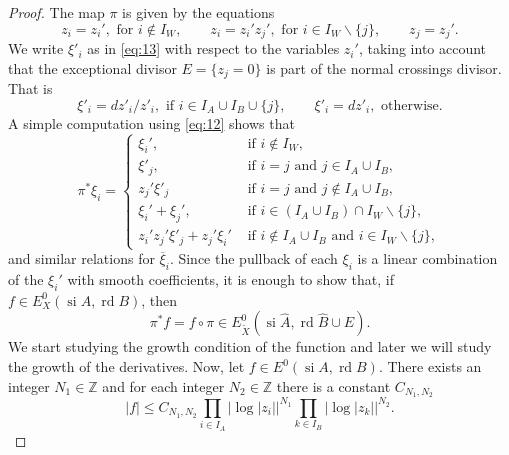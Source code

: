 \documentclass[11pt,a4paper]{amsart}
\newcommand{\Z}{\mathds{Z}}
\DeclareMathOperator{\si}{si}
\DeclareMathOperator{\rd}{rd}
\numberwithin{equation}{section}
\theoremstyle{plain}
\theoremstyle{definition}
\begin{document}
\begin{proof}
  The map $\pi $ is given by the equations
  \begin{equation}\label{eq:12}
    z_{i}=z_{i}', \text{ for }i\not \in I_{W},\qquad 
    z_{i}=z_{i}'z_{j}', \text{ for }i \in I_{W}\smallsetminus \{j\},\qquad
    z_{j}=z_{j}'.
  \end{equation}
  We write $\xi'_{i}$ as in \eqref{eq:13} with respect to the
  variables $z_{i}'$, taking into account that the exceptional divisor
  $E=\{z_{j}=0\}$ is part of the normal crossings divisor.  That is
  \begin{displaymath}
    \xi'_{i}=dz'_{i}/z'_{i},\text{ if }i\in I_{A}\cup
    I_{B}\cup\{j\},\qquad
    \xi'_{i}=dz'_{i},\text{ otherwise.}
  \end{displaymath}
  A simple computation using \eqref{eq:12} shows that 
  \begin{equation}\label{eq:14}
    \pi ^{\ast}\xi_{i}=
    \begin{cases}
      \xi_{i}',&\text{ if }i\not \in I_{W},\\
      \xi'_{j},&\text{ if }i=j\text{ and }j\in I_{A}\cup I_{B},\\
      z_{j}'\xi'_{j} &\text{ if }i=j\text{ and }j\not \in I_{A}\cup I_{B},\\
       \xi_{i}'+\xi_{j}',&\text{ if }i\in (I_{A}\cup I_{B})\cap
                           I_{W}\smallsetminus \{j\},\\
      z_{i}'z_{j}'\xi'_{j}+z_{j}'\xi_{i}'&\text{ if }i\not \in I_{A}\cup
                                           I_{B}\text{ and } i\in  I_{W}\smallsetminus \{j\},
    \end{cases}
  \end{equation}
and similar relations for $\overline{\xi}_{i}$. Since the pullback of
each $\xi_{i}$ is a linear combination of the $\xi_{i}'$  with smooth
coefficients, it is enough to show that, if $f\in E_{X}^0(\si A,\rd
B)$, then
\begin{displaymath}
  \pi ^{\ast}f = f\circ \pi \in E_{\widetilde X}^0(\si \widehat A,\rd \widehat B\cup E).
\end{displaymath}
We start studying the growth condition of the function and later we
will study the growth of the derivatives. 
  Now, let $f\in E^{0}(\si A, \rd B)$. There exists an integer $N_1\in
  \Z$ and for each integer $N_2\in \Z$  there is a
  constant $C_{N_1,N_2}$
\begin{displaymath}
 \left | f
    \right|\le C_{N_1,N_2}
    \prod_{i\in I_A}|\log|z_i||^{N_1}
    \prod_{k\in I_B}|\log|z_k||^{N_2}.
  \end{displaymath}

\end{proof}
\end{document}
